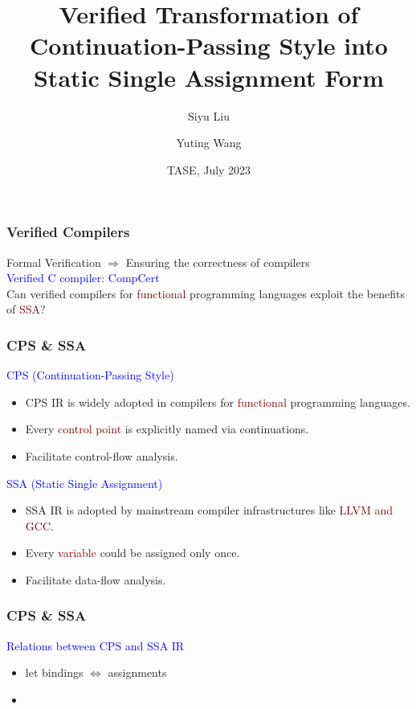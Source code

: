 \documentclass[xcolor={dvipsnames}]{beamer}
\title{Verified Transformation of Continuation-Passing Style into Static Single Assignment Form}
\author{Siyu Liu \and Yuting Wang}
\institute{School of Electronic Information and Electrical Engineering, \\
Shanghai Jiao Tong University}
\date{TASE, July 2023}
\begin{document}
\frame{\titlepage}

\begin{frame}
\frametitle{Verified Compilers}
\begin{center}
     Formal Verification $\Rightarrow $  
        Ensuring the correctness of compilers \\
\vspace{2ex}
\textcolor{Blue}{Verified C compiler: CompCert}\\
\vspace{2ex}
\Large
Can verified compilers for \textcolor{Maroon}{functional} programming languages
exploit the benefits of \textcolor{Maroon}{SSA}?
\end{center}
\end{frame}

\begin{frame}
\frametitle{CPS \& SSA}
\large
\textcolor{Blue}{CPS (Continuation-Passing Style)}\\
\normalsize
\begin{itemize}
    \item CPS IR is widely adopted in compilers for \textcolor{Maroon}{functional} programming languages.
    \item Every \textcolor{Maroon}{control point} is explicitly named via continuations.
    \item Facilitate control-flow analysis.
\end{itemize}
\vspace{2ex}
\large
\textcolor{Blue}{SSA (Static Single Assignment)}\\
\normalsize
\begin{itemize}
    \item SSA IR is adopted by mainstream compiler infrastructures
        like \textcolor{Maroon}{LLVM and GCC}.
    \item Every \textcolor{Maroon}{variable} could be assigned only once.
    \item Facilitate data-flow analysis.
\end{itemize}
\end{frame}

\begin{frame}
\frametitle{CPS \& SSA}
\large
\textcolor{Blue}{Relations between CPS and SSA IR}
\normalsize
\begin{itemize}
    \item let bindings $\Leftrightarrow $ assignments
    \item 
\end{itemize}
\end{frame}
\end{document}
